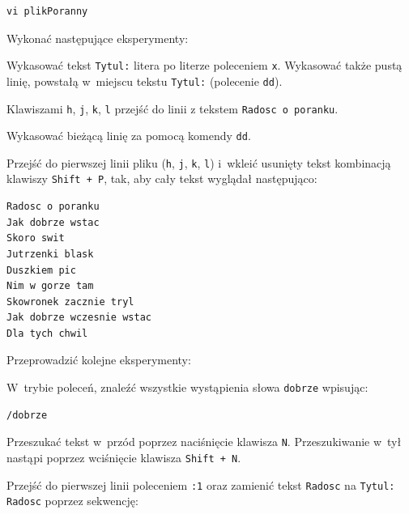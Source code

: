 \begin{example}
\begin{lstlisting}[style=MyBashStyle]
vi plikPoranny
\end{lstlisting}

Wykonać następujące eksperymenty:

\begin{myitemize}
  \item Wykasować tekst \lstinline[style=MyBashStyle]{Tytul:} litera po literze poleceniem \lstinline[style=MyBashStyle]{x}. Wykasować także pustą linię, powstałą w~miejscu tekstu \lstinline[style=MyBashStyle]{Tytul:} (polecenie \lstinline[style=MyBashStyle]{dd}).
\item Klawiszami \lstinline[style=MyBashStyle]{h}, \lstinline[style=MyBashStyle]{j}, \lstinline[style=MyBashStyle]{k}, \lstinline[style=MyBashStyle]{l} przejść do linii z tekstem \lstinline[style=MyBashStyle]{Radosc o poranku}.
\item Wykasować bieżącą linię za pomocą komendy \lstinline[style=MyBashStyle]{dd}.
\item Przejść do pierwszej linii pliku (\lstinline[style=MyBashStyle]{h}, \lstinline[style=MyBashStyle]{j}, \lstinline[style=MyBashStyle]{k}, \lstinline[style=MyBashStyle]{l}) i~wkleić usunięty tekst kombinacją klawiszy \lstinline[style=MyBashStyle]{Shift + P}, tak, aby cały tekst wyglądał następująco:
\end{myitemize}

\begin{lstlisting}[style=MyBashStyle]
Radosc o poranku
Jak dobrze wstac
Skoro swit
Jutrzenki blask
Duszkiem pic
Nim w gorze tam
Skowronek zacznie tryl
Jak dobrze wczesnie wstac
Dla tych chwil
\end{lstlisting}

Przeprowadzić kolejne eksperymenty:

\begin{myitemize}
\item W~trybie poleceń, znaleźć wszystkie wystąpienia słowa \lstinline[style=MyBashStyle]{dobrze} wpisując:
\end{myitemize}

\begin{lstlisting}[style=MyBashStyle]
/dobrze
\end{lstlisting}
\begin{myitemize}
\item Przeszukać tekst w~przód poprzez naciśnięcie klawisza \lstinline[style=MyBashStyle]{N}. Przeszukiwanie w~tył nastąpi poprzez wciśnięcie klawisza \lstinline[style=MyBashStyle]{Shift + N}.
\item Przejść do pierwszej linii poleceniem \lstinline[style=MyBashStyle]{:1} oraz zamienić tekst \lstinline[style=MyBashStyle]
{Radosc} na \lstinline[style=MyBashStyle]{Tytul: Radosc} poprzez sekwencję:
\end{myitemize}


\end{example}
